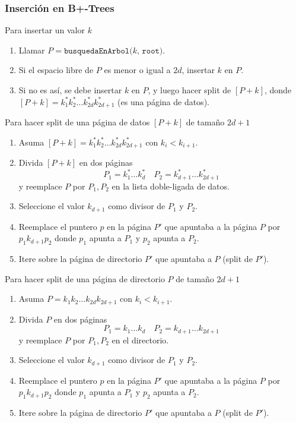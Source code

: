 
\subsubsection{Inserción en B+-Trees}
Para insertar un valor $k$
\begin{enumerate}
  \item Llamar $P = \texttt{busquedaEnArbol($k$, root)}$.
  \item Si el espacio libre de $P$ es menor o igual a $2d$, insertar $k$ en $P$.
  \item Si no es así, se debe insertar $k$ en $P$, y luego hacer split de $[P + k]$, donde $[P + k] = k_1^* k_2^* \ldots k_{2d}^* k_{2d+1}^*$ (es una página de datos).
\end{enumerate}

Para hacer split de una página de datos $[P + k]$ de tamaño $2d + 1$
\begin{enumerate}
  \item Asuma $[P + k] = k_1^* k_2^* \ldots k_{2d}^* k_{2d+1}^*$ con $k_i < k_{i+1}$.
  \item Divida $[P + k]$ en dos páginas
  \[ P_1 = k_1^* \ldots k_d^* \quad P_2 = k_{d+1}^* \ldots k_{2d+1}^* \]
  y reemplace $P$ por $P_1, P_2$ en la lista doble-ligada de datos.
  \item Seleccione el valor $k_{d+1}$ como divisor de $P_1$ y $P_2$.
  \item Reemplace el puntero $p$ en la página $P'$ que apuntaba a la página $P$ por $p_1 k_{d+1} p_2$ donde $p_1$ apunta a $P_1$ y $p_2$ apunta a $P_2$.
  \item Itere sobre la página de directorio $P'$ que apuntaba a $P$ (split de $P'$).
\end{enumerate}

Para hacer split de una página de directorio $P$ de tamaño $2d + 1$
\begin{enumerate}
  \item Asuma $P = k_1 k_2 \ldots k_{2d} k_{2d+1}$ con $k_i < k_{i+1}$.
  \item Divida $P$ en dos páginas
  \[ P_1 = k_1 \ldots k_d \quad P_2 = k_{d+1} \ldots k_{2d+1} \]
  y reemplace $P$ por $P_1, P_2$ en el directorio.
  \item Seleccione el valor $k_{d+1}$ como divisor de $P_1$ y $P_2$.
  \item Reemplace el puntero $p$ en la página $P'$ que apuntaba a la página $P$ por $p_1 k_{d+1} p_2$ donde $p_1$ apunta a $P_1$ y $p_2$ apunta a $P_2$.
  \item Itere sobre la página de directorio $P'$ que apuntaba a $P$ (split de $P'$).
\end{enumerate}

